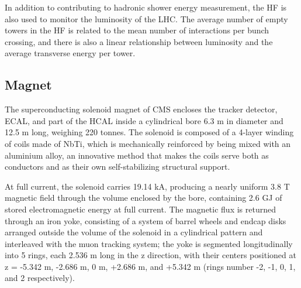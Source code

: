 In addition to contributing to hadronic shower energy measurement, the HF is also used to monitor the luminosity of the LHC. The average number of empty towers in the HF is related to the mean number of interactions per bunch crossing, and there is also a linear relationship between luminosity and the average transverse energy per tower.

\subsection{Magnet\label{sec:cms-magnet}}

The superconducting solenoid magnet of CMS encloses the tracker detector, ECAL, and part of the HCAL inside a cylindrical bore 6.3 m in diameter and 12.5 m long, weighing 220 tonnes. The solenoid is composed of a 4-layer winding of coils made of NbTi, which is mechanically reinforced by being mixed with an aluminium alloy, an innovative method that makes the coils serve both as conductors and as their own self-stabilizing structural support.

At full current, the solenoid carries 19.14 kA, producing a nearly uniform 3.8 T magnetic field through the volume enclosed by the bore, containing 2.6 GJ of stored electromagnetic energy at full current. The magnetic flux is returned through an iron yoke, consisting of a system of barrel wheels and endcap disks arranged outside the volume of the solenoid in a cylindrical pattern and interleaved with the muon tracking system; the yoke is segmented longitudinally into 5 rings, each 2.536 m long in the z direction, with their centers positioned at z = -5.342 m, -2.686 m, 0 m, +2.686 m, and +5.342 m (rings number -2, -1, 0, 1, and 2 respectively).

